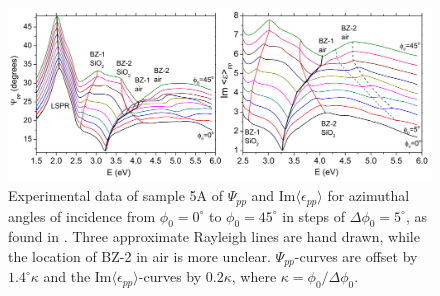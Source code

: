 \begin{figure}[h!]  %
    \centering
    \includegraphics[width=\linewidth]{figures/ch4/S5A/expdata/S5A_Psi_Imeps_stackedphi.png}
    \caption{Experimental data of sample 5A of $\Psi_{pp}$ and Im$\langle\epsilon_{pp}\rangle$ for azimuthal angles of incidence from $\phi_0=0^\circ$ to $\phi_0=45^\circ$ in steps of $\Delta\phi_0=5^\circ$, as found in \cite{Brakstad:15}. Three approximate Rayleigh lines are hand drawn, while the location of BZ-2 in air is more unclear. $\Psi_{pp}$-curves are offset by $1.4^\circ\kappa$ and the Im$\langle\epsilon_{pp}\rangle$-curves by $0.2\kappa$, where $\kappa=\phi_0/\Delta\phi_0$. }
    \label{fig:S5A_stacked_PsippImeps_exp}
\end{figure}

